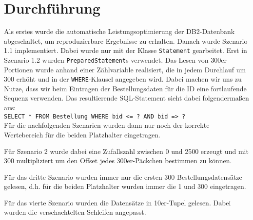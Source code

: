 \chapter{Durchführung}
Als erstes wurde die automatische Leistungsoptimierung der DB2-Datenbank abgeschaltet, um reproduzierbare Ergebnisse zu erhalten. Danach wurde Szenario 1.1 implementiert. Dabei wurde nur mit der Klasse \texttt{Statement} gearbeitet. Erst in Szenario 1.2 wurden \texttt{PreparedStatement}s verwendet. Das Lesen von 300er Portionen wurde anhand einer Zählvariable realisiert, die in jedem Durchlauf um 300 erhöht und in der \texttt{WHERE}-Klausel angegeben wird. Dabei machen wir uns zu Nutze, dass wir beim Eintragen der Bestellungsdaten für die ID eine fortlaufende Sequenz verwenden. Das resultierende SQL-Statement sieht dabei folgendermaßen aus: \\

\texttt{SELECT * FROM Bestellung WHERE bid <= ? AND bid => ?}\\

Für die nachfolgenden Szenarien wurden dann nur noch der korrekte Wertebereich für die beiden Platzhalter eingetragen.

Für Szenario 2 wurde dabei eine Zufallszahl zwischen 0 und 2500 erzeugt und mit 300 multipliziert um den Offset jedes 300er-Päckchen bestimmen zu können. 

Für das dritte Szenario wurden immer nur die ersten 300 Bestellungsdatensätze gelesen, d.h. für die beiden Platzhalter wurden immer die 1 und 300 eingetragen. 

Für das vierte Szenario wurden die Datensätze in 10er-Tupel gelesen. Dabei wurden die verschachtelten Schleifen angepasst.